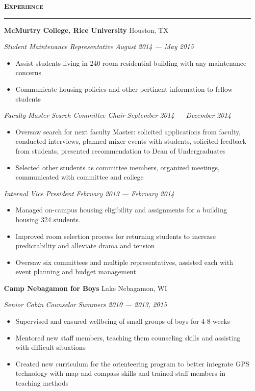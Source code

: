 \documentclass[10pt,letterpaper]{article}
\newcommand*{\seriffont}{\fontfamily{yv1}\selectfont}
\newenvironment{resumeSection}[1]{
{\Large \textbf{\textsc{#1}}}
\vspace{0.25em}
\hrule
\vspace{0.5em}
}{

}
\newenvironment{employer}[2]{
{\large \textbf{#1} \hfill #2} \newline
}{
\vspace{0.5em}
}
\newenvironment{position}[2]{
{\large \emph{#1} \hfill \emph{#2}}
\seriffont 
\begin{itemize}[noitemsep,topsep=0pt]
}{
\end{itemize}
\vspace{0.5em}
}
\begin{document}
\begin{resumeSection}{Experience}
\begin{employer}{McMurtry College, Rice University}{Houston, TX}
\begin{position}{Student Maintenance Representative}{August 2014 --- May 2015}
\item Assist students living in 240-room residential building with any maintenance concerns
\item Communicate housing policies and other pertinent information to fellow students
\end{position}
\begin{position}{Faculty Master Search Committee Chair}{September 2014 --- December 2014}
\item Oversaw search for next faculty Master: solicited applications from faculty, conducted interviews, planned mixer events with students, solicited feedback from students, presented recommendation to Dean of Undergraduates
\item Selected other students as committee members, organized meetings, communicated with committee and college
\end{position}
\begin{position}{Internal Vice President}{February 2013 --- February 2014}
\item Managed on-campus housing eligibility and assignments for a building housing 324 students.
\item Improved room selection process for returning students to increase predictability and alleviate drama and tension
\item Oversaw six committees and multiple representatives, assisted each with event planning and budget management
\end{position}
\end{employer}

\begin{employer}{Camp Nebagamon for Boys}{Lake Nebagamon, WI}
\begin{position}{Senior Cabin Counselor}{Summers 2010 --- 2013, 2015}
\item Supervised and ensured wellbeing of small groups of boys for 4-8 weeks
\item Mentored new staff members, teaching them counseling skills and assisting with difficult situations
\item Created new curriculum for the orienteering program to better integrate GPS technology with map and compass skills and trained staff members in teaching methods

\end{position}
\end{employer}

\end{resumeSection}
\end{document}
